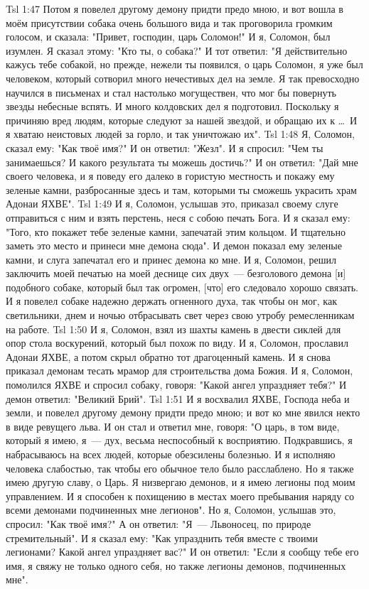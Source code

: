 \vs Tsl 1:47 
Потом я повелел другому демону придти предо мною, и вот вошла в моём присутствии собака очень большого вида и так проговорила громким голосом, и сказала: "Привет, господин, царь Соломон!" И я, Соломон, был изумлен. Я сказал этому: "Кто ты, о собака?" И тот ответил: "Я действительно кажусь тебе собакой, но прежде, нежели ты появился, о царь Соломон, я уже был человеком, который сотворил много нечестивых дел на земле. Я так превосходно научился в письменах и стал настолько могуществен, что мог бы повернуть звезды небесные вспять. И много колдовских дел я подготовил. Поскольку я причиняю вред людям, которые следуют за нашей звездой, и обращаю их к \ldots\ И я хватаю неистовых людей за горло, и так уничтожаю их".
\vs Tsl 1:48 
Я, Соломон, сказал ему: "Как твоё имя?" И он ответил: "Жезл". И я спросил: "Чем ты занимаешься? И какого результата ты можешь достичь?" И он ответил: "Дай мне своего человека, и я поведу его далеко в гористую местность и покажу ему зеленые камни, разбросанные здесь и там, которыми ты сможешь украсить храм Адонаи ЯХВЕ".
\vs Tsl 1:49 
И я, Соломон, услышав это, приказал своему слуге отправиться с ним и взять перстень, неся с собою печать Бога. И я сказал ему: "Того, кто покажет тебе зеленые камни, запечатай этим кольцом. И тщательно заметь это место и принеси мне демона сюда". И демон показал ему зеленые камни, и слуга запечатал его и принес демона ко мне. И я, Соломон, решил заключить моей печатью на моей деснице сих двух~--- безголового демона [и] подобного собаке, который был так огромен, [что] его следовало хорошо связать. И я повелел собаке надежно держать огненного духа, так чтобы он мог, как светильники, днем и ночью отбрасывать свет через свою утробу ремесленникам на работе.
\vs Tsl 1:50 
И я, Соломон, взял из шахты камень в двести сиклей для опор стола воскурений, который был похож по виду. И я, Соломон, прославил Адонаи ЯХВЕ, а потом скрыл обратно тот драгоценный камень. И я снова приказал демонам тесать мрамор для строительства дома Божия. И я, Соломон, помолился ЯХВЕ и спросил собаку, говоря: "Какой ангел упраздняет тебя?" И демон ответил: "Великий Брий".
\vs Tsl 1:51 
И я восхвалил ЯХВЕ, Господа неба и земли, и повелел другому демону придти предо мною; и вот ко мне явился некто в виде ревущего льва. И он стал и ответил мне, говоря: "О царь, в том виде, который я имею, я~--- дух, весьма неспособный к восприятию. Подкравшись, я набрасываюсь на всех людей, которые обезсилены болезнью. И я исполняю человека слабостью, так чтобы его обычное тело было расслаблено. Но я также имею другую славу, о Царь. Я низвергаю демонов, и я имею легионы под моим управлением. И я способен к похищению в местах моего пребывания наряду со всеми демонами подчиненных мне легионов". Но я, Соломон, услышав это, спросил: "Как твоё имя?" А он ответил: "Я~--- Львоносец, по природе стремительный". И я сказал ему: "Как упразднить тебя вместе с твоими легионами? Какой ангел упраздняет вас?" И он ответил: "Если я сообщу тебе его имя, я свяжу не только одного себя, но также легионы демонов, подчиненных мне".
